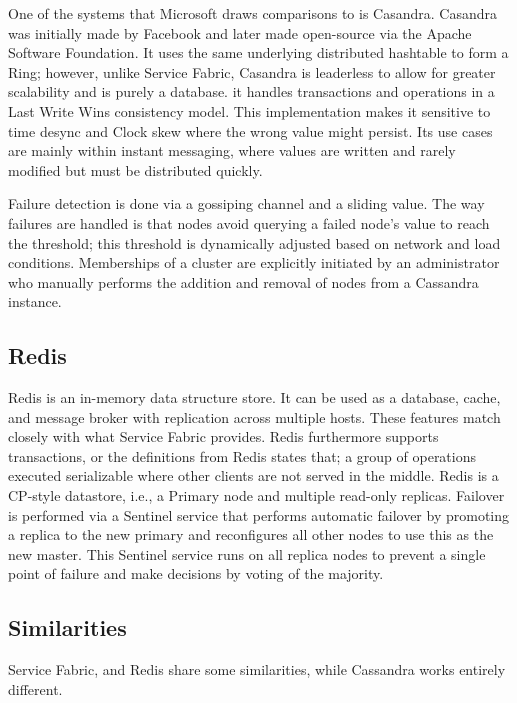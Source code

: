 \documentclass[a4paper,10pt,titlepage]{report}
\begin{document}
One of the systems that Microsoft draws comparisons to is Casandra. Casandra was initially made by Facebook and later made open-source via the Apache Software Foundation. It uses the same underlying distributed hashtable to form a Ring; however, unlike Service Fabric, Casandra is leaderless to allow for greater scalability and is purely a database. it handles transactions and operations in a Last Write Wins consistency model. This implementation makes it sensitive to time desync and Clock skew where the wrong value might persist. Its use cases are mainly within instant messaging, where values are written and rarely modified but must be distributed quickly. 

Failure detection is done via a gossiping channel and a sliding value. The way failures are handled is that nodes avoid querying a failed node's value to reach the threshold; this threshold is dynamically adjusted based on network and load conditions. Memberships of a cluster are explicitly initiated by an administrator who manually performs the addition and removal of nodes from a Cassandra instance.\cite{Cassandra}
    
    

\subsection{Redis}
Redis is an in-memory data structure store. It can be used as a database, cache, and message broker with replication across multiple hosts. These features match closely with what Service Fabric provides. Redis furthermore supports transactions, or the definitions from Redis states that; a group of operations executed serializable where other clients are not served in the middle. Redis is a CP-style datastore, i.e., a Primary node and multiple read-only replicas. 
Failover is performed via a Sentinel service that performs automatic failover by promoting a replica to the new primary and reconfigures all other nodes to use this as the new master. This Sentinel service runs on all replica nodes to prevent a single point of failure and make decisions by voting of the majority.


\subsection{Similarities}

Service Fabric, and Redis share some similarities, while Cassandra works entirely different. \\ 
\end{document}
